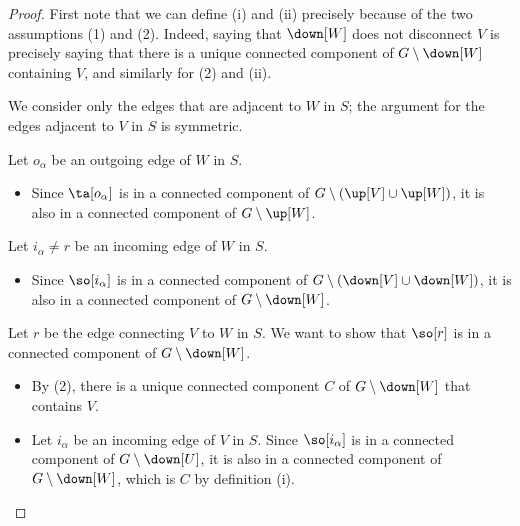 \documentclass{amsart}
\theoremstyle{definition}
\begin{document}
\begin{proof} First note that we can define (i) and (ii) precisely because of the two assumptions (1) and (2). Indeed, saying that $\down[W]$ does not disconnect $V$ is precisely saying that there is a unique connected component of $G\setminus\down[W]$ containing $V$, and similarly for (2) and (ii).
  
We consider only the edges that are adjacent to $W$ in $S$; the argument for the edges adjacent to $V$ in $S$ is symmetric. 
  
Let $o_\alpha$ be an outgoing edge of $W$ in $S$. 
  \begin{itemize}
    \item Since $\ta[o_\alpha]$ is in a connected component of $G \setminus (\up[V]\cup\up[W])$, it is also in a connected component of $G \setminus \up[W]$.
  \end{itemize}
  Let $i_\alpha \neq r$ be an incoming edge of $W$ in $S$. 
  \begin{itemize}
    \item Since $\so[i_\alpha]$ is in a connected component of $G \setminus (\down[V]\cup\down[W])$, it is also in a connected component of $G \setminus \down[W]$.
  \end{itemize}
  Let $r$ be the edge connecting $V$ to $W$ in $S$. We want to show that $\so[r]$ is in a connected component of $G \setminus \down[W]$.
  \begin{itemize}
    
    \item By (2), there is a unique connected component $C$ of $G \setminus {\down[W]}$ that contains $V$. 
    
    \item Let $i_\alpha$ be an incoming edge of $V$ in $S$. Since $\so[i_\alpha]$ is in a connected component of $G \setminus \down[U]$, it is also in a connected component of $G \setminus \down[W]$, which is $C$ by definition (i). 
    

\end{itemize}
\end{proof}
\end{document}
